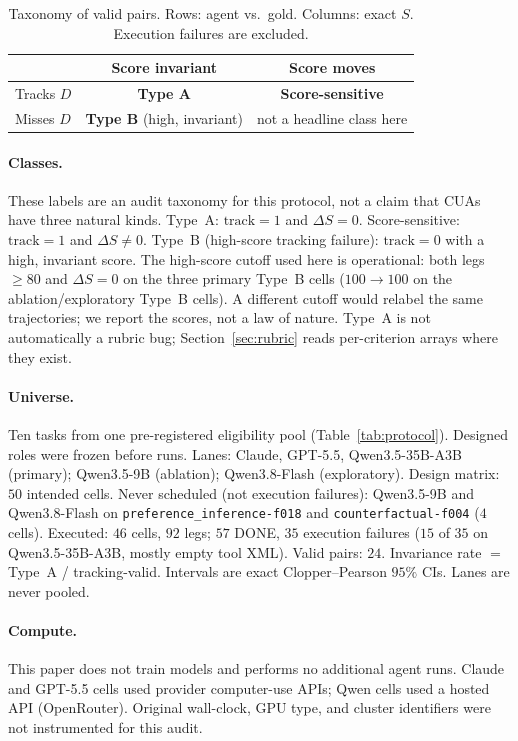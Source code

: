 \documentclass{article}
\newcommand{\task}[1]{\texttt{#1}}
\begin{document}
\begin{table}[t]
\centering
\small
\caption{Taxonomy of valid pairs. Rows: agent vs.\ gold. Columns: exact $S$. Execution failures are excluded.}
\label{tab:taxonomy}
\begin{tabular}{lcc}
\toprule
 & Score invariant & Score moves \\
\midrule
Tracks $D$ & \textbf{Type A} & \textbf{Score-sensitive} \\
Misses $D$ & \textbf{Type B} (high, invariant) & not a headline class here \\
\bottomrule
\end{tabular}
\end{table}

\paragraph{Classes.}
These labels are an audit taxonomy for this protocol, not a claim that CUAs have three natural kinds.
Type~A: $\mathrm{track}=1$ and $\Delta S=0$.
Score-sensitive: $\mathrm{track}=1$ and $\Delta S\neq 0$.
Type~B (high-score tracking failure): $\mathrm{track}=0$ with a high, invariant score.
The high-score cutoff used here is operational: both legs $\ge 80$ and $\Delta S=0$ on the three primary Type~B cells ($100{\to}100$ on the ablation/exploratory Type~B cells).
A different cutoff would relabel the same trajectories; we report the scores, not a law of nature.
Type~A is not automatically a rubric bug; Section~\ref{sec:rubric} reads per-criterion arrays where they exist.

\paragraph{Universe.}
Ten tasks from one pre-registered eligibility pool (Table~\ref{tab:protocol}).
Designed roles were frozen before runs.
Lanes: Claude, GPT-5.5, Qwen3.5-35B-A3B (primary); Qwen3.5-9B (ablation); Qwen3.8-Flash (exploratory).
Design matrix: $50$ intended cells.
Never scheduled (not execution failures): Qwen3.5-9B and Qwen3.8-Flash on \task{preference\_inference-f018} and \task{counterfactual-f004} ($4$ cells).
Executed: $46$ cells, $92$ legs; $57$ DONE, $35$ execution failures ($15$ of $35$ on Qwen3.5-35B-A3B, mostly empty tool XML).
Valid pairs: $24$.
Invariance rate $=$ Type~A / tracking-valid.
Intervals are exact Clopper--Pearson $95\%$ CIs.
Lanes are never pooled.

\paragraph{Compute.}
This paper does not train models and performs no additional agent runs.
Claude and GPT-5.5 cells used provider computer-use APIs; Qwen cells used a hosted API (OpenRouter).
Original wall-clock, GPU type, and cluster identifiers were not instrumented for this audit.
\end{document}
